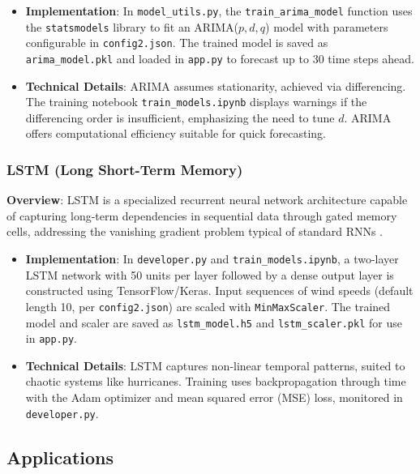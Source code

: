 \begin{itemize}
	\item \textbf{Implementation}: In \texttt{model\_utils.py}, the \texttt{train\_arima\_model} function uses the \texttt{statsmodels} library to fit an ARIMA($p,d,q$) model with parameters configurable in \texttt{config2.json}. The trained model is saved as \texttt{arima\_model.pkl} and loaded in \texttt{app.py} to forecast up to 30 time steps ahead.
	\item \textbf{Technical Details}: ARIMA assumes stationarity, achieved via differencing. The training notebook \texttt{train\_models.ipynb} displays warnings if the differencing order is insufficient, emphasizing the need to tune $d$. ARIMA offers computational efficiency suitable for quick forecasting.
\end{itemize}

\subsubsection{LSTM (Long Short-Term Memory)}

\textbf{Overview}: LSTM is a specialized recurrent neural network architecture capable of capturing long-term dependencies in sequential data through gated memory cells, addressing the vanishing gradient problem typical of standard RNNs \cite{HochreiterSchmidhuber1997}.

\begin{itemize}
	\item \textbf{Implementation}: In \texttt{developer.py} and \texttt{train\_models.ipynb}, a two-layer LSTM network with 50 units per layer followed by a dense output layer is constructed using TensorFlow/Keras. Input sequences of wind speeds (default length 10, per \texttt{config2.json}) are scaled with \texttt{MinMaxScaler}. The trained model and scaler are saved as \texttt{lstm\_model.h5} and \texttt{lstm\_scaler.pkl} for use in \texttt{app.py}.
	\item \textbf{Technical Details}: LSTM captures non-linear temporal patterns, suited to chaotic systems like hurricanes. Training uses backpropagation through time with the Adam optimizer and mean squared error (MSE) loss, monitored in \texttt{developer.py}.
\end{itemize}

\subsection{Applications}

